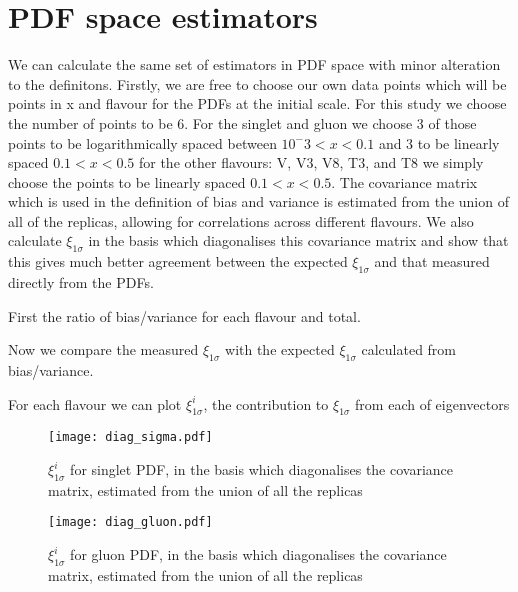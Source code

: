 \section{PDF space estimators}

We can calculate the same set of estimators in PDF space with minor alteration
to the definitons. Firstly, we are free to choose our own data points which will
be points in x and flavour for the PDFs at the initial scale. For this study we
choose the number
of points to be 6. For the singlet and gluon we choose 3 of those points to be
logarithmically spaced between $10^-3<x<0.1$ and 3 to be linearly spaced $0.1<x<0.5$
for the other flavours:  V, V3, V8, T3, and T8 we simply choose the points to be
linearly spaced $0.1<x<0.5$. The covariance matrix which is used in the definition
of bias and variance is estimated from the union of all of the replicas, allowing
for correlations across different flavours. We also calculate $\xi_{1\sigma}$
in the basis which diagonalises this covariance matrix and show that this gives
much better agreement between the expected $\xi_{1\sigma}$ and that measured
directly from the PDFs.

First the ratio of bias/variance for each flavour and total.



Now we compare the measured $\xi_{1\sigma}$ with the expected $\xi_{1\sigma}$
calculated from bias/variance.



For each flavour we can plot $\xi^{i}_{1\sigma}$, the contribution to $\xi_{1\sigma}$
from each of eigenvectors

\begin{figure}
    \centering
    \texttt{[image: diag\_sigma.pdf]}
    \caption{
        $\xi^{i}_{1\sigma}$ for singlet PDF, in the basis which diagonalises
        the covariance matrix, estimated from the union of all the replicas
    }
    \label{fig:pdfdiagsinglet}
\end{figure}

\begin{figure}
    \centering
    \texttt{[image: diag\_gluon.pdf]}
    \caption{
        $\xi^{i}_{1\sigma}$ for gluon PDF, in the basis which diagonalises
        the covariance matrix, estimated from the union of all the replicas
    }
    \label{fig:pdfdiaggluon}
\end{figure}


